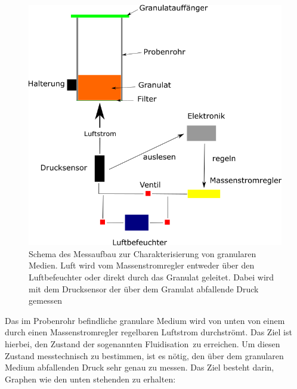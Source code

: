 \begin{figure}[h!]
		\begin{center}
		\includegraphics[scale=0.5]{Prinzip_Wirbelbett.png}
		\caption[Messaufbau Wirbelbett]{Schema des Messaufbau zur Charakterisierung von granularen Medien. Luft wird vom Massenstromregler entweder über den Luftbefeuchter oder direkt durch das Granulat geleitet. Dabei wird mit dem Drucksensor der über dem Granulat abfallende Druck gemessen}
	\end{center}
\end{figure}	


Das im Probenrohr befindliche granulare Medium wird von unten von einem durch einen Massenstromregler regelbaren Luftstrom durchströmt. Das Ziel ist hierbei, den Zustand der sogenannten \glqq Fluidisation\grqq \ zu erreichen. Um diesen Zustand messtechnisch zu bestimmen, ist es nötig, den über dem granularen Medium abfallenden Druck sehr genau zu messen. Das Ziel besteht darin, Graphen wie den unten stehenden zu erhalten:

